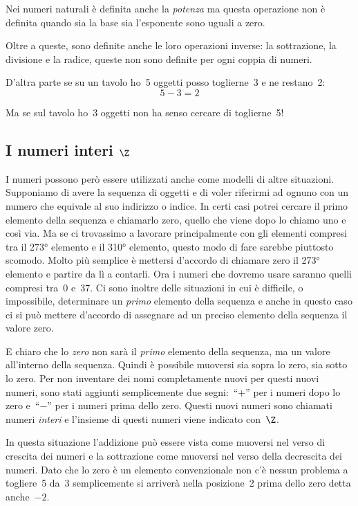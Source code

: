 Nei numeri naturali è definita anche la \emph{potenza} ma questa operazione 
non è definita quando sia la base sia l'esponente sono uguali a zero.

Oltre a queste, sono definite anche le loro operazioni inverse: la 
sottrazione, la divisione e la radice, queste non sono definite per ogni 
coppia di numeri.

D'altra parte se su un tavolo ho~5 oggetti posso toglierne~3 e ne restano~2:
\[5-3=2\]

Ma se sul tavolo ho~3 oggetti non ha senso cercare di toglierne~5!

\subsection{I numeri interi \(\Z\)}
\label{subsec:insnum_interi}

I numeri possono però essere utilizzati anche come modelli di altre 
situazioni. 
Supponiamo di avere la sequenza di oggetti e di voler riferirmi ad ognuno 
con un numero che equivale al suo indirizzo o indice. In certi casi potrei 
cercare il primo elemento della sequenza e chiamarlo zero, quello che viene 
dopo lo chiamo uno e così via. Ma se ci trovassimo a lavorare principalmente 
con gli elementi compresi tra il 273° elemento e il 310° elemento, questo 
modo di fare sarebbe piuttosto scomodo. 
Molto più semplice è mettersi d'accordo di chiamare zero il 273° elemento e 
partire da lì a contarli. Ora i numeri che dovremo usare saranno quelli 
compresi tra~0 e~37. 
Ci sono inoltre delle situazioni in cui è difficile, o impossibile, 
determinare un \emph{primo} elemento della sequenza e anche in questo caso 
ci si può mettere d'accordo di assegnare ad un preciso elemento della 
sequenza il valore zero.

E chiaro che lo \emph{zero} non sarà il \emph{primo} elemento della 
sequenza, ma un valore all'interno della sequenza. Quindi è possibile 
muoversi sia sopra lo zero, sia sotto lo zero.
Per non inventare dei nomi completamente nuovi per questi nuovi 
numeri, sono stati aggiunti semplicemente due segni:~``\(+\)'' per i numeri 
dopo lo zero e~``\(-\)'' per i numeri prima dello zero. 
Questi nuovi numeri sono chiamati numeri \emph{interi} 
e l'insieme di questi numeri viene indicato con~\(\Z\).

In questa situazione l'addizione può essere vista come muoversi nel verso 
di crescita dei numeri e la sottrazione come muoversi nel verso della 
decrescita dei numeri. Dato che lo zero è un elemento convenzionale non c'è 
nessun problema a togliere~5 da~3 semplicemente si arriverà nella 
posizione~2 prima dello zero detta anche~\(-2\).

